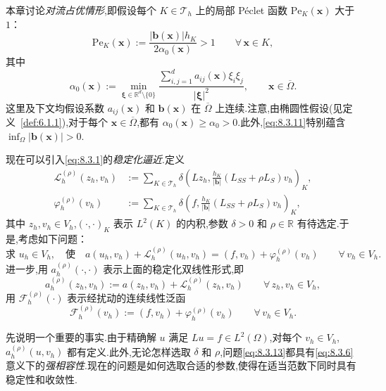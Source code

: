 本章讨论\emph{对流占优情形},即假设每个 \(K\in\mathcal T_h\) 上的局部 Péclet 函数 \(\mathrm{Pe}_K(\boldsymbol{x})\) 大于 \(1\)：
\begin{equation}\label{eq:8.3.11}
  \mathrm{Pe}_K(\boldsymbol{x}):=
    \frac{|\boldsymbol{b}(\boldsymbol{x})|h_K}{2\alpha_0(\boldsymbol{x})}>1
    \qquad\forall\,\boldsymbol{x}\in K,
\end{equation}
其中
\begin{equation}\label{eq:8.3.12}
  \alpha_0(\boldsymbol{x}):=\min_{\boldsymbol{\xi}\in\mathbb R^d\setminus\{0\}}
    \frac{\sum_{i,j=1}^d a_{ij}(\boldsymbol{x})\xi_i\xi_j}{|\boldsymbol{\xi}|^2},
      \qquad \boldsymbol{x}\in\overline\Omega.
\end{equation}
这里及下文均假设系数 \(a_{ij}(\boldsymbol{x})\) 和 \(\boldsymbol{b}(\boldsymbol{x})\) 在 \(\overline\Omega\) 上连续.注意,由椭圆性假设(见定义~\ref{def:6.1.1}),对于每个 \(\boldsymbol{x}\in\overline\Omega\),都有 \(\alpha_0(\boldsymbol{x})\ge\alpha_0>0\).此外,\eqref{eq:8.3.11}特别蕴含 \(\inf_\Omega|\boldsymbol{b}(\boldsymbol{x})|>0\).

现在可以引入\eqref{eq:8.3.1}的\emph{稳定化逼近}.定义
\[
  \begin{aligned}
    \mathcal L_h^{(\rho)}(z_h,v_h)
      &:=\sum_{K\in\mathcal T_h}\delta\left(
           Lz_h,\frac{h_K}{|\boldsymbol{b}|}(L_{SS}+\rho L_S)v_h\right)_K,\\
    \varphi_h^{(\rho)}(v_h)
      &:=\sum_{K\in\mathcal T_h}\delta\left(
           f,\frac{h_K}{|\boldsymbol{b}|}(L_{SS}+\rho L_S)v_h\right)_K,
  \end{aligned}
\]
其中 \(z_h,v_h\in V_h\),\((\cdot,\cdot)_K\) 表示 \(L^2(K)\) 的内积,参数 \(\delta>0\) 和 \(\rho\in\mathbb R\) 有待选定.于是,考虑如下问题：
\begin{equation}\label{eq:8.3.13}
  \text{求 }u_h\in V_h,\quad\text{使}\quad
     a(u_h,v_h)+\mathcal L_h^{(\rho)}(u_h,v_h)
       =(f,v_h)+\varphi_h^{(\rho)}(v_h)\qquad\forall\,v_h\in V_h.
\end{equation}
进一步,用 \(a_h^{(\rho)}(\cdot,\cdot)\) 表示上面的稳定化双线性形式,即
\begin{equation}\label{eq:8.3.14}
  a_h^{(\rho)}(z_h,v_h):=a(z_h,v_h)+\mathcal L_h^{(\rho)}(z_h,v_h)
     \qquad\forall\,z_h,v_h\in V_h,
\end{equation}
用 \(\mathcal F_h^{(\rho)}(\cdot)\) 表示经扰动的连续线性泛函
\[
  \mathcal F_h^{(\rho)}(v_h):=(f,v_h)+\varphi_h^{(\rho)}(v_h)\qquad\forall\,v_h\in V_h.
\]

先说明一个重要的事实.由于精确解 \(u\) 满足 \(Lu=f\in L^2(\Omega)\),对每个 \(v_h\in V_h\),\(a_h^{(\rho)}(u,v_h)\) 都有定义.此外,无论怎样选取 \(\delta\) 和 \(\rho\),问题\eqref{eq:8.3.13}都具有\eqref{eq:8.3.6}意义下的\emph{强相容性}.现在的问题是如何选取合适的参数,使得在适当范数下同时具有稳定性和收敛性.


